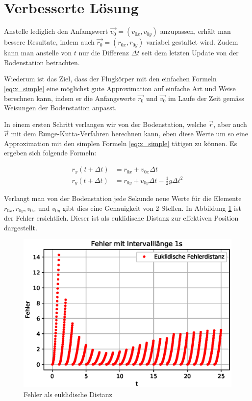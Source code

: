 \section{Verbesserte Lösung
\label{perturbation:section:verbesserte_loesung}}

Anstelle lediglich den Anfangswert $\vec{v_0} = (v_{0x}, v_{0y})$ anzupassen, erhält man bessere Resultate,
indem auch $\vec{r_0} = (r_{0x}, r_{0y})$ variabel gestaltet wird.
Zudem kann man anstelle von $t$ nur die Differenz $\Delta t$ seit dem letzten Update von der Bodenstation betrachten.

Wiederum ist das Ziel, dass der Flugkörper mit den einfachen Formeln \eqref{eq:x_simple} eine möglichst gute Approximation auf einfache Art und Weise berechnen kann,
indem er die Anfangswerte $\vec{r_0}$ und $\vec{v_0}$ im Laufe der Zeit gemäss Weisungen der Bodenstation anpasst.

In einem ersten Schritt verlangen wir von der Bodenstation, welche $\vec{r}$, aber auch $\vec{v}$ mit dem Runge-Kutta-Verfahren berechnen kann,
eben diese Werte um so eine Approximation mit den simplen Formeln \eqref{eq:x_simple} tätigen zu können.
Es ergeben sich folgende Formeln:

\begin{equation}
\begin{aligned}
r_x(t + \Delta t) &= r_{0x} + v_{0x}\Delta t\\
r_y(t + \Delta t) &= r_{0y} + v_{0y}\Delta t - \frac{1}{2}g\Delta t^2
\end{aligned}
\end{equation}

Verlangt man von der Bodenstation jede Sekunde neue Werte für die Elemente $r_{0x}, r_{0y}, v_{0x}$ und $v_{0y}$ gibt dies eine Genauigkeit von 2 Stellen.
In Abbildung \ref{error} ist der Fehler ersichtlich.
Dieser ist als euklidische Distanz zur effektiven Position dargestellt.

\begin{figure}
    \centering
    \includegraphics[scale = 0.7]{papers/perturbation/bilder/perturbation_fig3.eps}
    \caption{Fehler als euklidische Distanz}
	\label{error}
\end{figure}